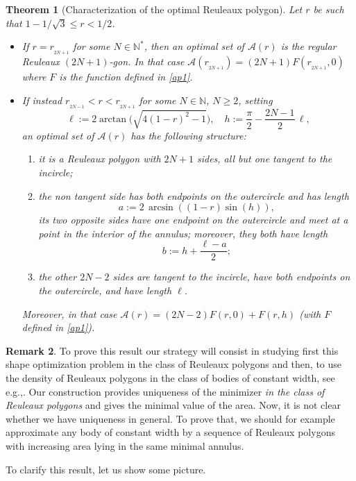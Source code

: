 \documentclass[11pt]{article}
\newcommand{\eg}{e.g.,\xspace}
\newcommand{\skpt}{\smallskip}
\numberwithin{equation}{section}
\let\mathcal\mathscr
\theoremstyle{plain}
\newtheorem{theorem}{Theorem}[section]
\theoremstyle{definition}
\newtheorem{remark}[theorem]{Remark}
\newcommand\A{\mathcal A}
\renewcommand\r{r_{_{2N+1}}}
\begin{document}
\skpt
\begin{theorem}[Characterization of the optimal Reuleaux polygon]\label{thm}
Let $r$ be such that $1-1/\sqrt{3}\leq r < 1/2$. 

\begin{itemize}
\item
If $r=\r$ for some $N\in \mathbb N^*$, then {an} optimal set of $\A(r)$ is the regular Reuleaux $(2N+1)$-gon. In that case $\A(\r)=(2N+1)F(\r,0)$ where $F$ is the function defined in \eqref{ap1}.

\item
If instead $r_{_{2N-1}}<r<r_{_{2N+1}}$ for some $N\in \mathbb N$, $N\geq 2$,
setting
\[
\ell:=2 \arctan\bigl(\sqrt{4(1-r)^2-1}\bigr),\quad h:=\frac\pi2 - \frac{2N-1}{2}\, \ell,
\]
an optimal set of $\A(r)$ has the following structure:
\begin{enumerate}
\item
it is a Reuleaux polygon with $2N+1$ sides, all but one tangent to the incircle;
\item
the non tangent side has both endpoints on the outercircle and has length
\[
a:=2\,\arcsin\left((1-r)\sin(h)\right),
\]
its two opposite sides have one endpoint on the outercircle and meet at a point in the interior of the annulus; moreover, they both have length
\[
b:= h + \frac{\ell -a}{2};
\]
\item
the other $2N-2$ sides are tangent to the incircle, have both endpoints on the outercircle, and have length $\ell$.
\end{enumerate}
Moreover, in that case $\A(r)=(2N-2)F(r,0)+F(r,h)$ (with $F$ defined in \eqref{ap1}).
\end{itemize}
\end{theorem}

\begin{remark}
To prove this result our strategy will consist in studying first this shape optimization problem
in the class of Reuleaux polygons and then, to use the density of Reuleaux polygons in the class of bodies of constant width, see \eg \cite{BF}.
Our construction provides uniqueness of the minimizer \emph{in the class of Reuleaux polygons}
and gives the minimal value of the area.
Now, it is not clear whether we have uniqueness in general. To prove that, we should
for example approximate any body of constant width by a sequence of Reuleaux polygons with increasing area lying in the same minimal annulus.
\end{remark}
To clarify this result, let us show some picture.
\end{document}
